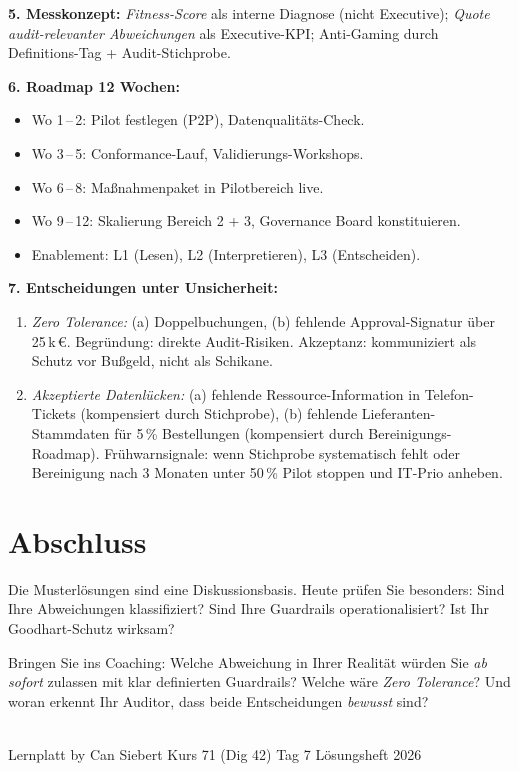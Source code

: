 \documentclass[11pt,a4paper,oneside]{article}
\begin{document}
\begin{loesungbox}
\smallskip
\textbf{5. Messkonzept:} \emph{Fitness-Score} als interne Diagnose (nicht Executive); \emph{Quote audit-relevanter Abweichungen} als Executive-KPI; Anti-Gaming durch Definitions-Tag + Audit-Stichprobe.

\smallskip
\textbf{6. Roadmap 12 Wochen:}
\begin{itemize}
  \item Wo 1\,--\,2: Pilot festlegen (P2P), Datenqualit\"ats-Check.
  \item Wo 3\,--\,5: Conformance-Lauf, Validierungs-Workshops.
  \item Wo 6\,--\,8: Ma{\ss}nahmenpaket in Pilotbereich live.
  \item Wo 9\,--\,12: Skalierung Bereich 2 + 3, Governance Board konstituieren.
  \item Enablement: L1 (Lesen), L2 (Interpretieren), L3 (Entscheiden).
\end{itemize}

\smallskip
\textbf{7. Entscheidungen unter Unsicherheit:}
\begin{enumerate}
  \item \emph{Zero Tolerance:} (a) Doppel\-buchungen, (b) fehlende Approval-Signatur \"uber 25\,k\,\euro. Begr\"undung: direkte Audit-Risiken. Akzeptanz: kommuniziert als Schutz vor Bu{\ss}geld, nicht als Schikane.
  \item \emph{Akzeptierte Datenl\"ucken:} (a) fehlende Ressource-Information in Telefon-Tickets (kompensiert durch Stichprobe), (b) fehlende Lieferanten-Stammdaten f\"ur 5\,\% Bestellungen (kompensiert durch Bereinigungs-Roadmap). Fr\"uhwarnsignale: wenn Stichprobe systematisch fehlt oder Bereinigung nach 3 Monaten unter 50\,\% \textrightarrow{} Pilot stoppen und IT-Prio anheben.
\end{enumerate}
\end{loesungbox}

\clearpage

\section*{Abschluss}
\thispagestyle{plain}

\noindent Die Musterl\"osungen sind eine Diskussionsbasis. Heute pr\"ufen Sie besonders: Sind Ihre Abweichungen klassifiziert? Sind Ihre Guardrails operationalisiert? Ist Ihr Goodhart-Schutz wirksam?

\medskip
\begin{infobox}
Bringen Sie ins Coaching: Welche Abweichung in Ihrer Realit\"at w\"urden Sie \emph{ab sofort} zulassen \textendash{} mit klar definierten Guardrails? Welche w\"are \emph{Zero Tolerance}? Und woran erkennt Ihr Auditor, dass beide Entscheidungen \emph{bewusst} sind?
\end{infobox}

\vspace{1cm}
\noindent{\color{lpAccent}\rule{\linewidth}{0.6pt}}\\[4pt]
{\footnotesize\sffamily\color{lpGray}Lernplatt \textperiodcentered{} by Can Siebert \textperiodcentered{} Kurs 71 (Dig 42) \textperiodcentered{} Tag 7 \textperiodcentered{} L\"osungsheft \textperiodcentered{} \textcopyright{} 2026}
\end{document}
